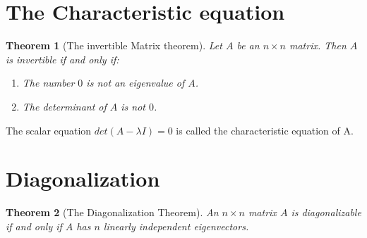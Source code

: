 \documentclass[oneside]{report}
\newtheorem{theorem}{Theorem}[section]
\begin{document}
  \section{The Characteristic equation}
  \begin{theorem}[The invertible Matrix theorem]
    Let $A$ be an $n\times n$ matrix. Then $A$ is invertible if and only if:
    \begin{enumerate}
      \item The number $0$ is not an eigenvalue of $A$.
      \item The determinant of $A$ is not $0$.
    \end{enumerate}
  \end{theorem}

  The scalar equation $det(A - \lambda I) = 0$ is called the characteristic equation of A.

\section{Diagonalization}

\begin{theorem}[The Diagonalization Theorem]
  An $n \times n$ matrix $A$ is diagonalizable if and only if $A$ has $n$ linearly independent eigenvectors.
\end{theorem}
\end{document}
